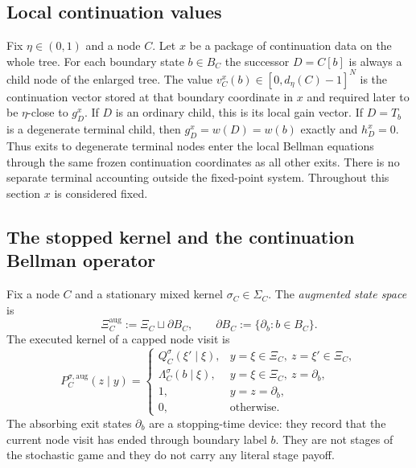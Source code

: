 \documentclass[12pt]{article}
\theoremstyle{definition}
\newcommand{\1}{\mathbf{1}}
\begin{document}
\subsection{Local continuation values}

Fix $\eta\in(0,1)$ and a node $C$. Let $x$ be a package of continuation data on the
whole tree. For each boundary state $b\in B_C$ the successor $D=C[b]$ is always a
child node of the enlarged tree. The value
$v_C^x(b)\in[0,d_\eta(C)-1]^N$ is the continuation vector stored at that boundary
coordinate in $x$ and required later to be $\eta$-close to $g_D^x$. If $D$ is an
ordinary child, this is its local gain vector. If $D=T_b$ is a degenerate
terminal child, then $g_D^x=w(D)=w(b)$ exactly and $h_D^x=0$. Thus exits to
degenerate terminal nodes enter the local Bellman equations through the same
frozen continuation coordinates as all other exits. There is no separate
terminal accounting outside the fixed-point system. Throughout this section $x$
is considered fixed.


\subsection{The stopped kernel and the continuation Bellman operator}

Fix a node $C$ and a stationary mixed kernel $\sigma_C\in\Sigma_C$. The
\emph{augmented state space} is
\[
\Xi_C^{\mathrm{aug}}:=\Xi_C\sqcup \partial B_C,
\qquad
\partial B_C:=\{\partial_b:b\in B_C\}.
\]
The executed kernel of a capped node visit is
\begin{equation}
\label{eq:aug-kernel}
P_C^{\sigma,\mathrm{aug}}(z\mid y)
=
\begin{cases}
Q_C^{\sigma}(\xi'\mid \xi), & y=\xi\in\Xi_C,\ z=\xi'\in\Xi_C,\\[0.3em]
\Lambda_C^{\sigma}(b\mid \xi), & y=\xi\in\Xi_C,\ z=\partial_b,\\[0.3em]
1, & y=z=\partial_b,\\[0.3em]
0, & \text{otherwise.}
\end{cases}
\end{equation}
The absorbing exit states $\partial_b$ are a stopping-time device: they record
that the current node visit has ended through boundary label $b$. They are not
stages of the stochastic game and they do not carry any literal stage payoff.
\end{document}
